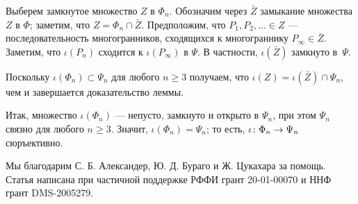 \documentclass[oneside,a4paper]{article}
\begin{document}
Выберем замкнутое множество $Z$ в $\Phi_n$.
Обозначим через $\bar Z$ замыкание множества $Z$ в $\Phi$; заметим, что $Z=\Phi_n\cap \bar Z$.
Предположим, что $P_1,P_2,\dots\in Z$ --- последовательность многогранников, сходящихся к многограннику $P_\infty\in\bar Z$.
Заметим, что $\iota(P_n)$ сходится к $\iota(P_\infty)$  в $\Psi$.
В частности, $\iota(\bar Z)$ замкнуто в~$\Psi$.

Поскольку $\iota(\Phi_n)\subset \Psi_n$ для любого $n\ge 3$ получаем, что  $\iota (Z)=\iota(\bar Z)\cap \Psi_n$, чем и завершается доказательство леммы. 

\medskip

Итак, множество $\iota(\Phi_n)$ --- непусто, замкнуто и открыто в $\Psi_n$, при этом $\Psi_n$ связно для любого $n\ge 3$.
Значит, $\iota(\Phi_n)=\Psi_n$; то есть, $\iota\:\Phi_n\z\to\Psi_n$ сюръективно.
\qeds

 Мы благодарим С. Б. Александер, Ю. Д. Бураго и Ж. Цукахара за помощь. 
Статья написана при частичной поддержке РФФИ грант 20-01-00070 и ННФ грант DMS-2005279.

\sloppy
\printbibliography[heading=bibintoc]
\fussy
\end{document}
